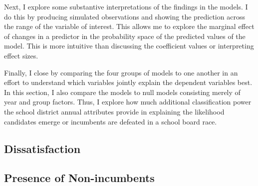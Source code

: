 Next, I explore some substantive interpretations of the findings in the models. I do this by producing simulated observations and showing the prediction across the range 
of the variable of interest. This allows me to explore the marginal effect of 
changes in a predictor in the probability space of the predicted values of the 
model. This is more intuitive than discussing the coefficient values or 
interpreting effect sizes. 

Finally, I close by comparing the four groups of models to one another in an effort 
to understand which variables jointly explain the dependent variables best. In this 
section, I also compare the models to null models consisting merely of year and 
group factors. Thus, I explore how much additional classification power the school 
district annual attributes provide in explaining the likelihood candidates emerge 
or incumbents are defeated in a school board race. 





\subsection{Dissatisfaction}




\subsection{Presence of Non-incumbents}



